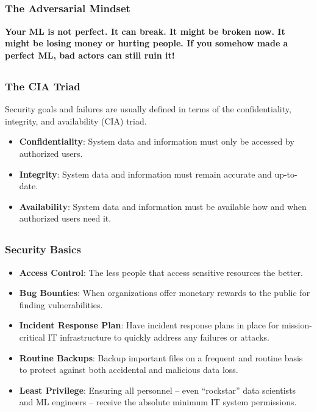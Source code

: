 \documentclass[11pt,
               aspectratio=169,
               hyperref={colorlinks}
               ]{beamer}
\begin{document}
	\subsection*{}
	\begin{frame}
		
		\frametitle{The Adversarial Mindset}
			
		\LARGE{\textbf{Your ML is not perfect. It can break. It might be broken now. It might be losing money or hurting people. If you somehow made a perfect ML, bad actors can still ruin it!}}
			
	\end{frame}	
	
	\subsection*{}
	\begin{frame}
		
		\frametitle{The CIA Triad}
		
		Security goals and failures are usually defined in terms of the confidentiality, integrity, and availability (CIA) triad.
		
		\begin{itemize}
			\item \textbf{Confidentiality}: System data and information must only be accessed by authorized users.
			\item \textbf{Integrity}: System data and information must remain accurate and up-to-date.
			\item \textbf{Availability}: System data and information must be available how and when authorized users need it.
		\end{itemize}

	\end{frame}	

	\subsection*{}
	\begin{frame}
		
		\frametitle{Security Basics}
		
		\begin{itemize}
			\item \textbf{Access Control}: The less people that access sensitive resources the better.
			\item \textbf{Bug Bounties}: When organizations offer monetary rewards to the public for finding vulnerabilities.
			\item \textbf{Incident Response Plan}: Have incident response plans in place for mission-critical IT infrastructure to quickly address any failures or attacks.
			\item \textbf{Routine Backups}: Backup important files on a frequent and routine basis to protect against both accidental and malicious data loss.	
			\item \textbf{Least Privilege}: Ensuring all personnel -- even “rockstar” data scientists and ML engineers -- receive the absolute minimum IT system permissions.
		\end{itemize}

	\end{frame}
\end{document}
